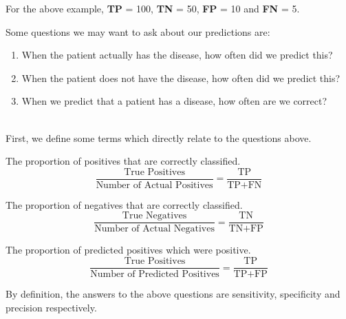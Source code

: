 \documentclass[11pt,fleqn]{book} %
\begin{document}
\begin{example}
	For the above example, \textbf{TP} = 100, \textbf{TN} = 50, \textbf{FP} = 10 and \textbf{FN} = 5.
\end{example}

\noindent
Some questions we may want to ask about our predictions are:
\begin{enumerate}
	\item When the patient actually has the disease, how often did we predict this?
	\item When the patient does not have the disease, how often did we predict this?
	\item When we predict that a patient has a disease, how often are we correct?
\end{enumerate}

\noindent
\\First, we define some terms which directly relate to the questions above.\\

\begin{definition}
The proportion of positives that are correctly classified.
\begin{equation*}
	\frac{\text{True Positives}}{\text{Number of Actual Positives}} = \frac{\text{TP}}{\text{TP+FN}}
\end{equation*}
\end{definition}

\begin{definition}[Specificity]
The proportion of negatives that are correctly classified.
\begin{equation*}
	\frac{\text{True Negatives}}{\text{Number of Actual Negatives}} = \frac{\text{TN}}{\text{TN+FP}}
\end{equation*}
\end{definition}

\begin{definition}[Precision]
The proportion of predicted positives which were positive.
\begin{equation*}
	\frac{\text{True Positives}}{\text{Number of Predicted Positives}} = \frac{\text{TP}}{\text{TP+FP}}
\end{equation*}
\end{definition}

\begin{example}
	By definition, the answers to the above questions are sensitivity, specificity and precision respectively.
\end{example}
\end{document}
